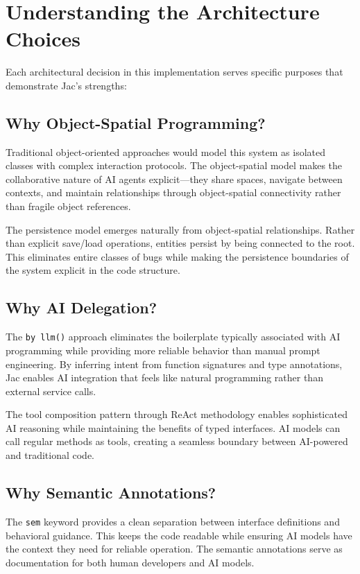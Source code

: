 \section{Understanding the Architecture Choices}

Each architectural decision in this implementation serves specific purposes that demonstrate Jac's strengths:

\subsection{Why Object-Spatial Programming?}

Traditional object-oriented approaches would model this system as isolated classes with complex interaction protocols. The object-spatial model makes the collaborative nature of AI agents explicit—they share spaces, navigate between contexts, and maintain relationships through object-spatial connectivity rather than fragile object references.

The persistence model emerges naturally from object-spatial relationships. Rather than explicit save/load operations, entities persist by being connected to the root. This eliminates entire classes of bugs while making the persistence boundaries of the system explicit in the code structure.

\subsection{Why AI Delegation?}

The \texttt{by llm()} approach eliminates the boilerplate typically associated with AI programming while providing more reliable behavior than manual prompt engineering. By inferring intent from function signatures and type annotations, Jac enables AI integration that feels like natural programming rather than external service calls.

The tool composition pattern through ReAct methodology enables sophisticated AI reasoning while maintaining the benefits of typed interfaces. AI models can call regular methods as tools, creating a seamless boundary between AI-powered and traditional code.

\subsection{Why Semantic Annotations?}

The \texttt{sem} keyword provides a clean separation between interface definitions and behavioral guidance. This keeps the code readable while ensuring AI models have the context they need for reliable operation. The semantic annotations serve as documentation for both human developers and AI models.


